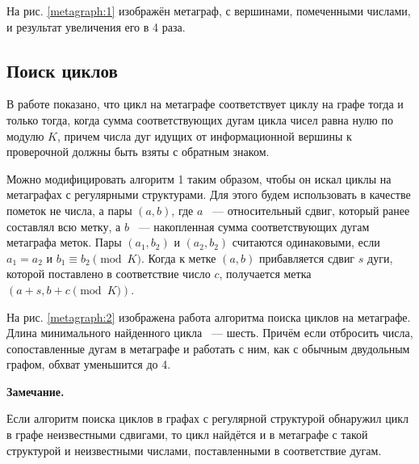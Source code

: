 \documentclass[14pt]{mmcs-article}
\begin{document}
На рис. \ref{metagraph:1} изображён метаграф, с вершинами, помеченными числами, и результат увеличения его в 4 раза.

\subsection{Поиск циклов}

В работе \cite{metagraphs} показано, что цикл на метаграфе соответствует циклу на графе тогда и только тогда, когда сумма соответствующих дугам цикла чисел равна нулю по модулю $K$, причем числа дуг идущих от информационной вершины к проверочной должны быть взяты с обратным знаком.

Можно модифицировать алгоритм 1 таким образом, чтобы он искал циклы на метаграфах с регулярными структурами. Для этого будем использовать в качестве пометок не числа, а пары $(a, b)$, где $a$ ~--- относительный сдвиг, который ранее составлял всю метку, а $b$ ~--- накопленная сумма соответствующих дугам метаграфа меток. Пары $(a_1, b_2)$ и $(a_2, b_2)$ считаются одинаковыми, если $a_1 = a_2$ и $b_1 \equiv b_2 \pmod K$. Когда к метке $(a, b)$ прибавляется сдвиг $s$ дуги, которой поставлено в соответствие число $c$, получается метка $(a + s, b + c \pmod K)$.

На рис. \ref{metagraph:2} изображена работа алгоритма поиска циклов на метаграфе. Длина минимального найденного цикла ~--- шесть. Причём если отбросить числа, сопоставленные дугам в метаграфе и работать с ним, как с обычным двудольным графом, обхват уменьшится до 4.

\textbf{Замечание.}

Если алгоритм поиска циклов в графах с регулярной структурой обнаружил цикл в графе неизвестными сдвигами, то цикл найдётся и в метаграфе с такой структурой и неизвестными числами, поставленными в соответствие дугам.
\end{document}
